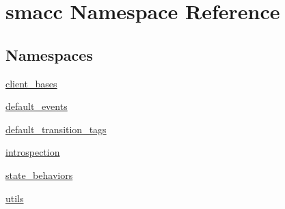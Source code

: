 \hypertarget{namespacesmacc}{}\section{smacc Namespace Reference}
\label{namespacesmacc}
\subsection*{Namespaces}
\begin{DoxyCompactItemize}
\item 
 \hyperlink{namespacesmacc_1_1client__bases}{client\+\_\+bases}
\item 
 \hyperlink{namespacesmacc_1_1default__events}{default\+\_\+events}
\item 
 \hyperlink{namespacesmacc_1_1default__transition__tags}{default\+\_\+transition\+\_\+tags}
\item 
 \hyperlink{namespacesmacc_1_1introspection}{introspection}
\item 
 \hyperlink{namespacesmacc_1_1state__behaviors}{state\+\_\+behaviors}
\item 
 \hyperlink{namespacesmacc_1_1utils}{utils}
\end{DoxyCompactItemize}
